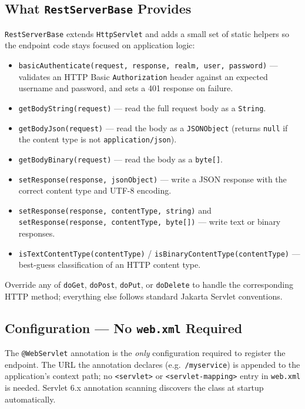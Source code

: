 \subsection{What \texttt{RestServerBase} Provides}

\texttt{RestServerBase} extends \texttt{HttpServlet} and adds a small set of static helpers so the endpoint code stays focused on application logic:

\begin{itemize}
  \item \texttt{basicAuthenticate(request, response, realm, user, password)} --- validates an HTTP Basic \texttt{Authorization} header against an expected username and password, and sets a 401 response on failure.
  \item \texttt{getBodyString(request)} --- read the full request body as a \texttt{String}.
  \item \texttt{getBodyJson(request)} --- read the body as a \texttt{JSONObject} (returns \texttt{null} if the content type is not \texttt{application/json}).
  \item \texttt{getBodyBinary(request)} --- read the body as a \texttt{byte[]}.
  \item \texttt{setResponse(response, jsonObject)} --- write a JSON response with the correct content type and UTF-8 encoding.
  \item \texttt{setResponse(response, contentType, string)} and \texttt{setResponse(response, contentType, byte[])} --- write text or binary responses.
  \item \texttt{isTextContentType(contentType)} / \texttt{isBinaryContentType(contentType)} --- best-guess classification of an HTTP content type.
\end{itemize}

Override any of \texttt{doGet}, \texttt{doPost}, \texttt{doPut}, or \texttt{doDelete} to handle the corresponding HTTP method; everything else follows standard Jakarta Servlet conventions.

\subsection{Configuration --- No \texttt{web.xml} Required}

The \texttt{@WebServlet} annotation is the \emph{only} configuration required to register the endpoint.  The URL the annotation declares (e.g.\ \texttt{/myservice}) is appended to the application's context path; no \texttt{<servlet>} or \texttt{<servlet-mapping>} entry in \texttt{web.xml} is needed.  Servlet 6.x annotation scanning discovers the class at startup automatically.

